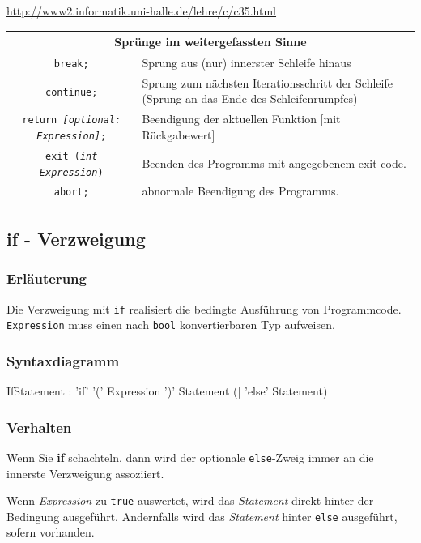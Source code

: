 \documentclass[a4paper]{report}
\begin{document}
\url{http://www2.informatik.uni-halle.de/lehre/c/c35.html}
\begin{center}
\begin{tabular}{|c|p{10cm}|} \hline
	\multicolumn{2}{|c|}{\textbf{Sprünge im weitergefassten Sinne}} \\ \hline
	\texttt{break;} & Sprung aus (nur) innerster Schleife hinaus \\
	\texttt{continue;} & Sprung zum nächsten Iterationsschritt der Schleife (Sprung an das Ende des Schleifenrumpfes) \\
	\texttt{return \textit{[{\small optional:} Expression]};} & Beendigung der aktuellen Funktion [mit Rückgabewert] \\
	\texttt{exit (\textit{int Expression})} & Beenden des Programms mit angegebenem exit-code. \\
	\texttt{abort;} & abnormale Beendigung des Programms. \\ \hline
\end{tabular}
\end{center}
\subsection{if - Verzweigung}
\subsubsection{Erläuterung}
Die Verzweigung mit \texttt{if} realisiert die bedingte Ausführung von Programmcode. \texttt{Expression} muss einen nach \texttt{bool} konvertierbaren Typ aufweisen.
\subsubsection{Syntaxdiagramm}
\begin{rail}
	IfStatement : 'if' '(' Expression ')'
							Statement
							(| 'else' Statement)
\end{rail}
\subsubsection{Verhalten}
Wenn Sie \textbf{if} schachteln, dann wird der optionale \texttt{else}-Zweig immer an die innerste Verzweigung assoziiert.

Wenn \textit{Expression} zu \texttt{true} auswertet, wird das \textit{Statement} direkt hinter der Bedingung ausgeführt. Andernfalls wird das \textit{Statement} hinter \texttt{else} ausgeführt, sofern vorhanden.
\end{document}
